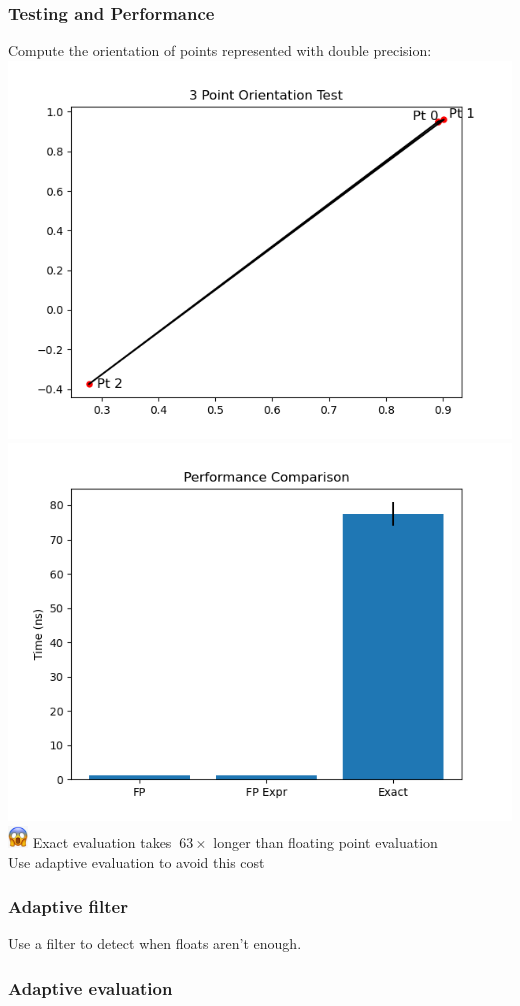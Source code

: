 \documentclass{beamer}
\begin{document}
\begin{frame}[fragile]
  \frametitle{Testing and Performance}
  Compute the orientation of points represented with double precision:
  \includegraphics[width=0.475\linewidth]{images/orienttest.png}
  \hspace{1mm}
  \includegraphics[width=0.475\linewidth]{images/exact_benchmark.png}\\
  \includegraphics[width=20px]{images/scream.png} Exact evaluation takes $~63\times$ longer than floating point evaluation\\
  Use adaptive evaluation to avoid this cost
\end{frame}

\begin{frame}[fragile]
  \frametitle{Adaptive filter}
  Use a filter to detect when floats aren't enough.
  
\end{frame}

\begin{frame}[fragile]
  \frametitle{Adaptive evaluation}
  
\end{frame}
\end{document}
